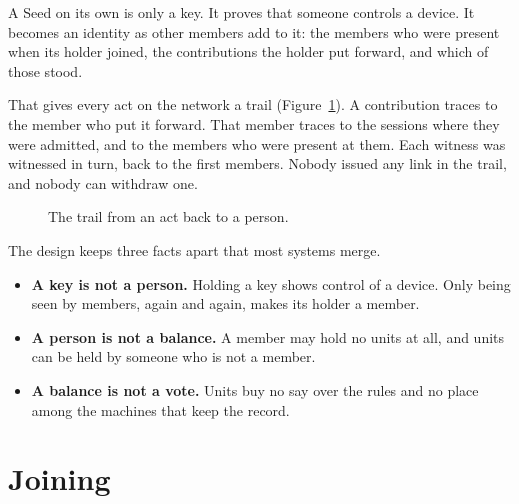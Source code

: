 \documentclass[11pt,a4paper]{article}
\begin{document}
A Seed on its own is only a key. It proves that someone controls a device. It becomes an identity as other members add to it: the members who were present when its holder joined, the contributions the holder put forward, and which of those stood.

That gives every act on the network a trail (Figure~\ref{fig:trail}). A contribution traces to the member who put it forward. That member traces to the sessions where they were admitted, and to the members who were present at them. Each witness was witnessed in turn, back to the first members. Nobody issued any link in the trail, and nobody can withdraw one.

\begin{figure}[h]
\centering
{}
\caption{The trail from an act back to a person.}
\label{fig:trail}
\end{figure}

The design keeps three facts apart that most systems merge.

\begin{itemize}
  \item \textbf{A key is not a person.} Holding a key shows control of a device. Only being seen by members, again and again, makes its holder a member.
  \item \textbf{A person is not a balance.} A member may hold no units at all, and units can be held by someone who is not a member.
  \item \textbf{A balance is not a vote.} Units buy no say over the rules and no place among the machines that keep the record.
\end{itemize}

\section{Joining}
\label{sec:joining}
\end{document}
